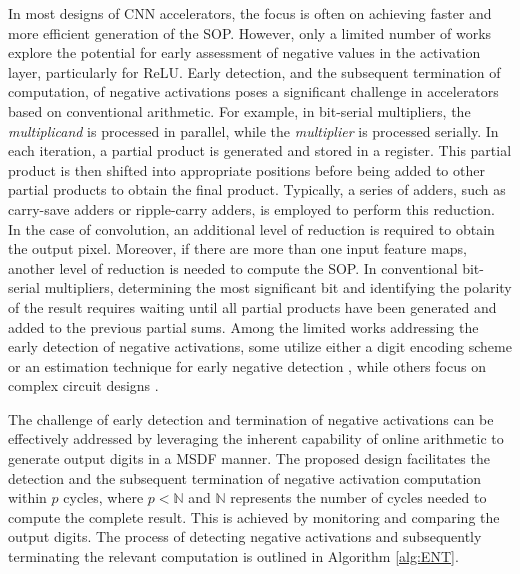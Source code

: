\documentclass[conference]{IEEEtran}
\begin{document}

In most designs of CNN accelerators, the focus is often on achieving faster and more efficient generation of the SOP. However, only a limited number of works explore the potential for early assessment of negative values in the activation layer, particularly for ReLU. Early detection, and the subsequent termination of computation, of negative activations poses a significant challenge in accelerators based on conventional arithmetic. For example, in bit-serial multipliers, the \emph{multiplicand} is processed in parallel, while the \emph{multiplier} is processed serially. In each iteration, a partial product is generated and stored in a register. This partial product is then shifted into appropriate positions before being added to other partial products to obtain the final product. Typically, a series of adders, such as carry-save adders or ripple-carry adders, is employed to perform this reduction. In the case of convolution, an additional level of reduction is required to obtain the output pixel. Moreover, if there are more than one input feature maps, another level of reduction is needed to compute the SOP. In conventional bit-serial multipliers, determining the most significant bit and identifying the polarity of the result requires waiting until all partial products have been generated and added to the previous partial sums. Among the limited works addressing the early detection of negative activations, some utilize either a digit encoding scheme or an estimation technique for early negative detection \cite{kim2021compreend}, while others focus on complex circuit designs \cite{shuvo2020msb}.


The challenge of early detection and termination of negative activations can be effectively addressed by leveraging the inherent capability of online arithmetic to generate output digits in a MSDF manner. The proposed design facilitates the detection and the subsequent termination of negative activation computation within \(p\) cycles, where \(p < \mathbb{N}\) and \(\mathbb{N}\) represents the number of cycles needed to compute the complete result. This is achieved by monitoring and comparing the output digits. The process of detecting negative activations and subsequently terminating the relevant computation is outlined in Algorithm \ref{alg:ENT}.
\end{document}
